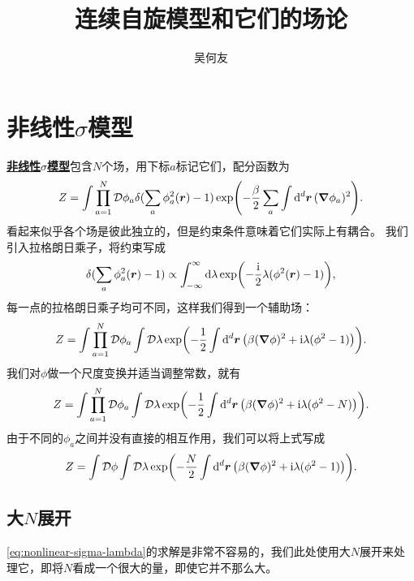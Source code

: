 \documentclass[hyperref, UTF8, a4paper]{ctexart}
\title{连续自旋模型和它们的场论}
\author{吴何友}
\newcommand*{\ii}{\mathrm{i}}
\newcommand*{\fd}[1]{\mathop{}\!\mathcal{D} #1}
\newcommand*{\concept}[1]{\underline{\textbf{#1}}}
\begin{document}
\maketitle

\section{非线性$\sigma$模型}

\concept{非线性$\sigma$模型}包含$N$个场，用下标$a$标记它们，配分函数为
\begin{equation}
    Z = \int \prod_{a=1}^N \fd{\phi_a} \delta(\sum_a \phi_a^2(\vb*{r}) - 1) \exp(- \frac{\beta}{2} \sum_a \int \dd[d]{\vb*{r}} (\grad{\phi_a})^2 ).
\end{equation}
看起来似乎各个场是彼此独立的，但是约束条件意味着它们实际上有耦合。
我们引入拉格朗日乘子，将约束写成
\[
    \delta(\sum_a \phi_a^2(\vb*{r}) - 1) \propto \int_{-\infty}^\infty \dd{\lambda} \exp(- \frac{\ii}{2} \lambda (\phi^2(\vb*{r}) - 1 )),
\]
每一点的拉格朗日乘子均可不同，这样我们得到一个辅助场：
\[
    Z = \int \prod_{a=1}^N \fd{\phi_a} \int \fd{\lambda} \exp(- \frac{1}{2} \int \dd[d]{\vb*{r}} \left( \beta (\grad{\phi})^2 + \ii \lambda (\phi^2 - 1) \right) ).
\]
我们对$\phi$做一个尺度变换并适当调整常数，就有
\[
    Z = \int \prod_{a=1}^N \fd{\phi_a} \int \fd{\lambda} \exp(- \frac{1}{2} \int \dd[d]{\vb*{r}} \left( \beta (\grad{\phi})^2 + \ii \lambda (\phi^2 - N) \right) ).
\]
由于不同的$\phi_a$之间并没有直接的相互作用，我们可以将上式写成
\begin{equation}
    Z = \int \fd{\phi} \int \fd{\lambda} \exp(- \frac{N}{2} \int \dd[d]{\vb*{r}} \left( \beta (\grad{\phi})^2 + \ii \lambda (\phi^2 - 1) \right) ).
    \label{eq:nonlinear-sigma-lambda}
\end{equation}

\subsection{大$N$展开}

\eqref{eq:nonlinear-sigma-lambda}的求解是非常不容易的，我们此处使用大$N$展开来处理它，即将$N$看成一个很大的量，即使它并不那么大。
\end{document}
